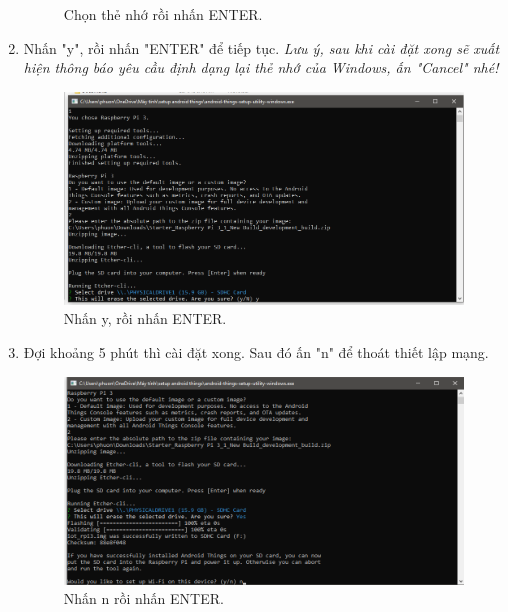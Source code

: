 \begin{enumerate}
\begin{center}
\begin{figure}[htp]
\caption{Chọn thẻ nhớ rồi nhấn ENTER.}
\label{refhinh1}
\end{figure}
\end{center}
\newpage
\item Nhấn "y", rồi nhấn "ENTER" để tiếp tục. \textit{Lưu ý, sau khi cài đặt xong sẽ xuất hiện thông báo yêu cầu định dạng lại thẻ nhớ của Windows, ấn "Cancel" nhé!}
\begin{center}
\begin{figure}[htp]
\begin{center}
\includegraphics[scale=0.52]{image3/buoc2cach2s11.png}
\end{center}
\caption{Nhấn y, rồi nhấn ENTER.}
\label{refhinh1}
\end{figure}
\end{center}
\item Đợi khoảng 5 phút thì cài đặt xong. Sau đó ấn "n" để thoát thiết lập mạng.
\begin{center}
\begin{figure}[htp]
\begin{center}
\includegraphics[scale=0.52]{image3/buoc2cach2s12.png}
\end{center}
\caption{Nhấn n rồi nhấn ENTER.}

\end{figure}
\end{center}
\end{enumerate}
